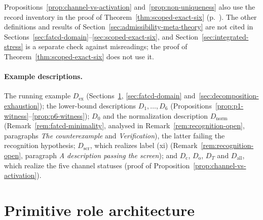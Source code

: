\documentclass[11pt]{article}
\theoremstyle{definition}
\begin{document}
Propositions~\ref{prop:channel-vs-activation} and~\ref{prop:non-uniqueness}
also use the record inventory in the proof of
Theorem~\ref{thm:scoped-exact-six} (p.~\pageref{thm:scoped-exact-six}). The other definitions and results of
Section~\ref{sec:admissibility-meta-theory} are not cited in
Sections~\ref{sec:fatcd-domain}--\ref{sec:scoped-exact-six}, and
Section~\ref{sec:integrated-stress} is a separate check against misreadings;
the proof of Theorem~\ref{thm:scoped-exact-six} does not use it.

\paragraph{Example descriptions.} The running example \(D_{\mathrm{ex}}\)
(Sections~\ref{sec:primitive-role-architecture}, \ref{sec:fatcd-domain}
and~\ref{sec:decomposition-exhaustion}); the lower-bound descriptions
\(D_1,\dots,D_6\) (Propositions~\ref{prop:p1-witness}--\ref{prop:p6-witness});
\(D_0\) and the normalization description \(D_{\mathrm{norm}}\)
(Remark~\ref{rem:fatcd-minimality}, analysed in
Remark~\ref{rem:recognition-open}, paragraphs \emph{The counterexample} and \emph{Verification}), the latter failing the recognition
hypothesis; \(D_{\mathrm{scr}}\), which realizes label (xi)
(Remark~\ref{rem:recognition-open}, paragraph \emph{A description passing the screen}); and \(D_{\mathrm c}\), \(D_{\mathrm o}\),
\(D_T\) and \(D_{\mathrm{all}}\), which realize the five channel statuses
(proof of Proposition~\ref{prop:channel-vs-activation}).
 \section{Primitive role architecture}\label{sec:primitive-role-architecture}
\end{document}
